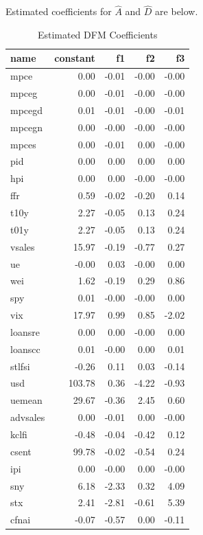\documentclass[11pt, letterpaper]{article}\usepackage[]{graphicx}\usepackage[]{color}
\begin{document}
Estimated coefficients for $\widehat{A}$ and $\widehat{D}$ are below.
\begin{table}[H]
\centering
\begingroup\footnotesize
\begin{tabular}{lrrrr}
  \hline
name & constant & f1 & f2 & f3 \\ 
  \hline
mpce & 0.00 & -0.01 & -0.00 & -0.00 \\ 
  mpceg & 0.00 & -0.01 & -0.00 & -0.00 \\ 
  mpcegd & 0.01 & -0.01 & -0.00 & -0.01 \\ 
  mpcegn & 0.00 & -0.00 & -0.00 & -0.00 \\ 
  mpces & 0.00 & -0.01 & 0.00 & -0.00 \\ 
  pid & 0.00 & 0.00 & 0.00 & 0.00 \\ 
  hpi & 0.00 & 0.00 & -0.00 & -0.00 \\ 
  ffr & 0.59 & -0.02 & -0.20 & 0.14 \\ 
  t10y & 2.27 & -0.05 & 0.13 & 0.24 \\ 
  t01y & 2.27 & -0.05 & 0.13 & 0.24 \\ 
  vsales & 15.97 & -0.19 & -0.77 & 0.27 \\ 
  ue & -0.00 & 0.03 & -0.00 & 0.00 \\ 
  wei & 1.62 & -0.19 & 0.29 & 0.86 \\ 
  spy & 0.01 & -0.00 & -0.00 & 0.00 \\ 
  vix & 17.97 & 0.99 & 0.85 & -2.02 \\ 
  loansre & 0.00 & 0.00 & -0.00 & 0.00 \\ 
  loanscc & 0.01 & -0.00 & 0.00 & 0.01 \\ 
  stlfsi & -0.26 & 0.11 & 0.03 & -0.14 \\ 
  usd & 103.78 & 0.36 & -4.22 & -0.93 \\ 
  uemean & 29.67 & -0.36 & 2.45 & 0.60 \\ 
  advsales & 0.00 & -0.01 & 0.00 & -0.00 \\ 
  kclfi & -0.48 & -0.04 & -0.42 & 0.12 \\ 
  csent & 99.78 & -0.02 & -0.54 & 0.24 \\ 
  ipi & 0.00 & -0.00 & 0.00 & -0.00 \\ 
  sny & 6.18 & -2.33 & 0.32 & 4.09 \\ 
  stx & 2.41 & -2.81 & -0.61 & 5.39 \\ 
  cfnai & -0.07 & -0.57 & 0.00 & -0.11 \\ 
   \hline
\end{tabular}
\endgroup
\caption{Estimated DFM Coefficients} 
\end{table}
\end{document}
